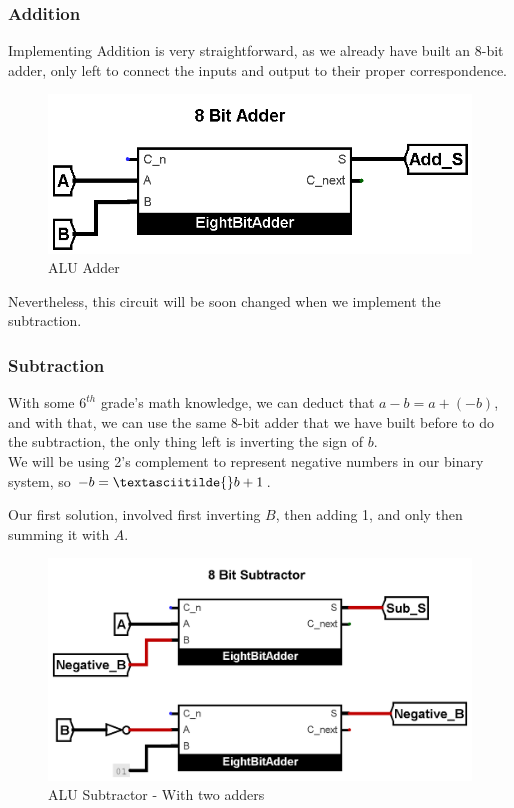 \documentclass{article}
\begin{document}
\subsubsection{Addition}

Implementing Addition is very straightforward, as we already have built an 8-bit adder, only left to connect the inputs and output to their proper correspondence.

\begin{figure}[H]
    \centering
    \includegraphics[width=.6\textwidth]{circuits/Add.png}
    \caption{ALU Adder}
\end{figure}

Nevertheless, this circuit will be soon changed when we implement the subtraction.

\subsubsection{Subtraction}

With some $6^{th}$ grade's math knowledge, we can deduct that $a - b = a + (-b)$, and with that, we can use the same 8-bit adder that we have built before to do the subtraction, the only thing left is inverting the sign of $b$. \\
We will be using 2's complement to represent negative numbers in our binary system, so $-b = \textasciitilde{}b + 1$.

Our first solution, involved first inverting $B$, then adding 1, and only then summing it with $A$.

\begin{figure}[H]
    \centering
    \includegraphics[width=.7\textwidth]{circuits/Subtractor_StupidWay.png}
    \caption{ALU Subtractor - With two adders}
\end{figure}
\end{document}

